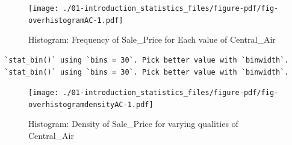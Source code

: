 \documentclass[
  letterpaper,
  DIV=11,
  numbers=noendperiod]{scrreprt}
\newenvironment{Shaded}{\begin{snugshade}}{\end{snugshade}}
\newcommand{\AttributeTok}[1]{\textcolor[rgb]{0.40,0.45,0.13}{#1}}
\newcommand{\DecValTok}[1]{\textcolor[rgb]{0.68,0.00,0.00}{#1}}
\newcommand{\FloatTok}[1]{\textcolor[rgb]{0.68,0.00,0.00}{#1}}
\newcommand{\FunctionTok}[1]{\textcolor[rgb]{0.28,0.35,0.67}{#1}}
\newcommand{\NormalTok}[1]{\textcolor[rgb]{0.00,0.23,0.31}{#1}}
\newcommand{\SpecialCharTok}[1]{\textcolor[rgb]{0.37,0.37,0.37}{#1}}
\newcommand{\StringTok}[1]{\textcolor[rgb]{0.13,0.47,0.30}{#1}}
\begin{document}
\begin{figure}[H]

{\centering \texttt{[image: ./01-introduction\_statistics\_files/figure-pdf/fig-overhistogramAC-1.pdf]}

}

\caption{\label{fig-overhistogramAC}Histogram: Frequency of Sale\_Price
for Each value of Central\_Air}

\end{figure}

\begin{Shaded}
\end{Shaded}

\begin{verbatim}
`stat_bin()` using `bins = 30`. Pick better value with `binwidth`.
`stat_bin()` using `bins = 30`. Pick better value with `binwidth`.
\end{verbatim}

\begin{figure}[H]

{\centering \texttt{[image: ./01-introduction\_statistics\_files/figure-pdf/fig-overhistogramdensityAC-1.pdf]}

}

\caption{\label{fig-overhistogramdensityAC}Histogram: Density of
Sale\_Price for varying qualities of Central\_Air}

\end{figure}
\end{document}
